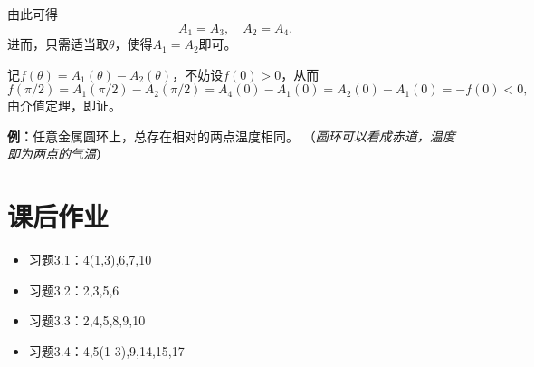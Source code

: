 \begin{center}
\end{center}

由此可得
$$A_1=A_3,\quad A_2=A_4.$$
进而，只需适当取$\theta$，使得$A_1=A_2$即可。

记$f(\theta)=A_1(\theta)-A_2(\theta)$，不妨设$f(0)>0$，从而
$$f(\pi/2)=A_1(\pi/2)-A_2(\pi/2)=A_4(0)-A_1(0)=A_2(0)-A_1(0)=-f(0)<0,$$
由介值定理，即证。

{\bf 例：}任意金属圆环上，总存在相对的两点温度相同。
（{\it 圆环可以看成赤道，温度即为两点的气温}）

\newpage

\section*{课后作业}

\begin{itemize}
  \item 习题3.1：4(1,3),6,7,10
  \item 习题3.2：2,3,5,6
  \item 习题3.3：2,4,5,8,9,10
  \item 习题3.4：4,5(1-3),9,14,15,17
\end{itemize}

